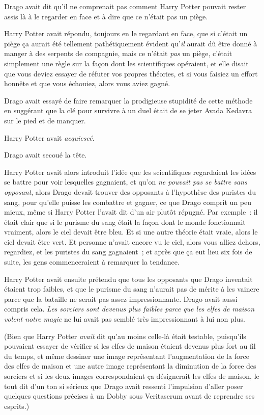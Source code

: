 Drago avait dit qu'il ne comprenait pas comment Harry Potter pouvait rester assis là à le regarder en face et à dire que ce n'était pas un piège.

Harry Potter avait répondu, toujours en le regardant en face, que si c'était un piège ça aurait été tellement pathétiquement évident qu'\emph{il} aurait dû être donné à manger à des serpents de compagnie, mais ce n'était \emph{pas} un piège, c'était simplement une règle sur la façon dont les scientifiques opéraient, et elle disait que vous deviez essayer de réfuter vos propres théories, et si vous faisiez un effort honnête et que vous échouiez, alors vous aviez gagné.

Drago avait essayé de faire remarquer la prodigieuse stupidité de cette méthode en suggérant que la clé pour survivre à un duel était de se jeter Avada Kedavra sur le pied et de manquer.

Harry Potter avait \emph{acquiescé}.

Drago avait secoué la tête.

Harry Potter avait alors introduit l'idée que les scientifiques regardaient les idées se battre pour voir lesquelles gagnaient, et qu'on \emph{ne pouvait pas se battre sans opposant}, alors Drago devait trouver des opposants à l'hypothèse des puristes du sang, pour qu'elle puisse les combattre et gagner, ce que Drago comprit un peu mieux, même si Harry Potter l'avait dit d'un air plutôt répugné.
Par exemple~: il était clair que si le purisme du sang était la façon dont le monde fonctionnait vraiment, alors le ciel devait être bleu.
Et si une autre théorie était vraie, alors le ciel devait être vert.
Et personne n'avait encore vu le ciel, alors vous alliez dehors, regardiez, et les puristes du sang gagnaient~; et après que ça eut lieu six fois de suite, les gens commenceraient à remarquer la tendance.

Harry Potter avait ensuite prétendu que tous les opposants que Drago inventait étaient trop faibles, et que le purisme du sang n'aurait pas de mérite à les vaincre parce que la bataille ne serait pas assez impressionnante.
Drago avait aussi compris cela.
\emph{Les sorciers sont devenus plus faibles parce que les elfes de maison volent notre magie} ne lui avait pas semblé très impressionnant à lui non plus.

(Bien que Harry Potter \emph{avait} dit qu'au moins celle-là était testable, puisqu'ils pouvaient essayer de vérifier si les elfes de maison étaient devenus plus fort au fil du temps, et même dessiner une image représentant l'augmentation de la force des elfes de maison et une autre image représentant la diminution de la force des sorciers et si les deux images correspondaient ça désignerait les elfes de maison, le tout dit d'un ton si sérieux que Drago avait ressenti l'impulsion d'aller poser quelques questions précises à un Dobby sous Veritaserum avant de reprendre ses esprits.)

